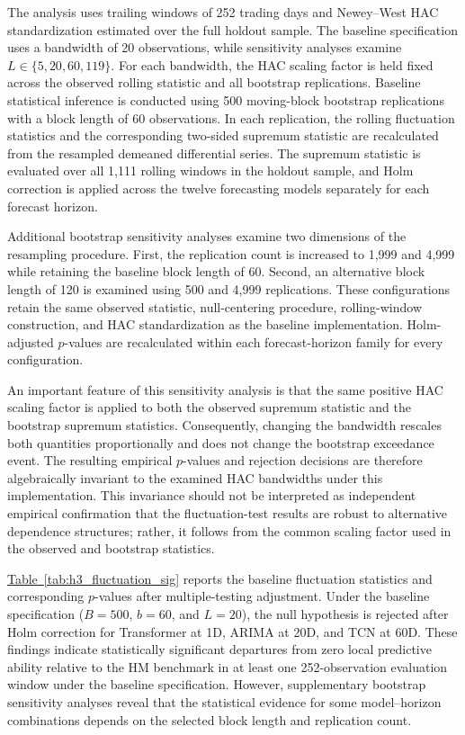 \documentclass[runningheads,orivec]{llncs}
\begin{document}
The analysis uses trailing windows of 252 trading days and Newey--West HAC standardization estimated over the full holdout sample. The baseline specification uses a bandwidth of 20 observations, while sensitivity analyses examine $L\in\{5,20,60,119\}$. For each bandwidth, the HAC scaling factor is held fixed across the observed rolling statistic and all bootstrap replications. Baseline statistical inference is conducted using 500 moving-block bootstrap replications with a block length of 60 observations. In each replication, the rolling fluctuation statistics and the corresponding two-sided supremum statistic are recalculated from the resampled demeaned differential series. The supremum statistic is evaluated over all 1,111 rolling windows in the holdout sample, and Holm correction is applied across the twelve forecasting models separately for each forecast horizon.

Additional bootstrap sensitivity analyses examine two dimensions of the resampling procedure. First, the replication count is increased to 1,999 and 4,999 while retaining the baseline block length of 60. Second, an alternative block length of 120 is examined using 500 and 4,999 replications. These configurations retain the same observed statistic, null-centering procedure, rolling-window construction, and HAC standardization as the baseline implementation. Holm-adjusted $p$-values are recalculated within each forecast-horizon family for every configuration.

An important feature of this sensitivity analysis is that the same positive HAC scaling factor is applied to both the observed supremum statistic and the bootstrap supremum statistics. Consequently, changing the bandwidth rescales both quantities proportionally and does not change the bootstrap exceedance event. The resulting empirical $p$-values and rejection decisions are therefore algebraically invariant to the examined HAC bandwidths under this implementation. This invariance should not be interpreted as independent empirical confirmation that the fluctuation-test results are robust to alternative dependence structures; rather, it follows from the common scaling factor used in the observed and bootstrap statistics.

\hyperref[tab:h3_fluctuation_sig]{Table~\ref*{tab:h3_fluctuation_sig}} reports the baseline fluctuation statistics and corresponding $p$-values after multiple-testing adjustment. Under the baseline specification ($B=500$, $b=60$, and $L=20$), the null hypothesis is rejected after Holm correction for Transformer at 1D, ARIMA at 20D, and TCN at 60D. These findings indicate statistically significant departures from zero local predictive ability relative to the HM benchmark in at least one 252-observation evaluation window under the baseline specification. However, supplementary bootstrap sensitivity analyses reveal that the statistical evidence for some model--horizon combinations depends on the selected block length and replication count.
\end{document}
